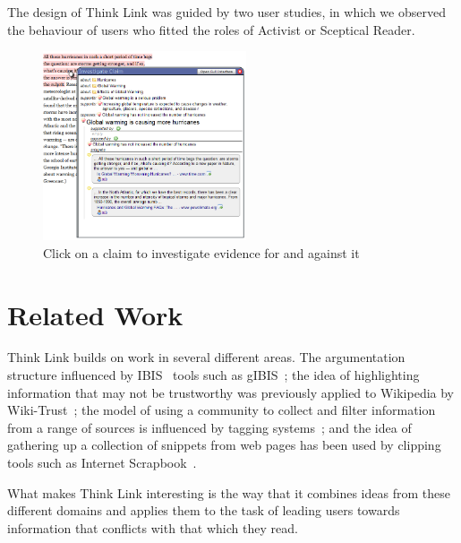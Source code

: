 \documentclass{chi2009}
\begin{document}
The design of Think Link was guided by two user studies, in which we observed the behaviour of users who fitted the roles of Activist or Sceptical Reader. 

\begin{figure}[tb]
	\begin{center}
	\includegraphics[width=6cm]{../screenshots/claim_popup_crop2.png}
	\caption{Click on a claim to investigate evidence for and against it}
	\label{claimview}
	\end{center}
\end{figure}



\section{Related Work}

Think Link builds on work in several different areas. The argumentation structure influenced by IBIS~\cite{Rittel1973} tools such as gIBIS~\cite{Conklin1987a}; the idea of highlighting information that may not be trustworthy was previously applied to Wikipedia by Wiki-Trust~\cite{Adler2008}; the model of using a community to collect and filter information from a range of sources is influenced by tagging systems~\cite{Marlow2006}; and the idea of gathering up a collection of snippets from web pages has been used by clipping tools such as Internet Scrapbook~\cite{Sugiura1998}. 

What makes Think Link interesting is the way that it combines ideas from these different domains and applies them to the task of leading users towards information that conflicts with that which they read.
\end{document}
